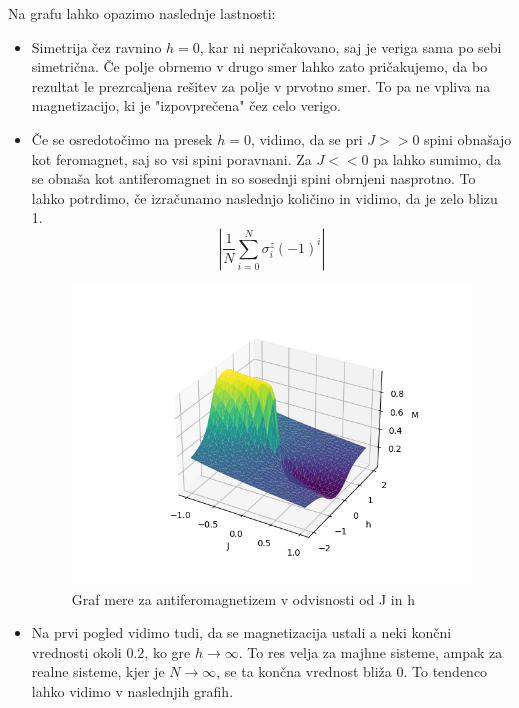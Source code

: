 \documentclass{article}
\begin{document}
\noindent Na grafu lahko opazimo naslednje lastnosti:
\begin{itemize}
    \item Simetrija čez ravnino $h = 0$, kar ni nepričakovano, saj je veriga sama po sebi simetrična. Če polje obrnemo v drugo smer lahko zato pričakujemo, da bo rezultat le prezrcaljena rešitev za polje v prvotno smer. To pa ne vpliva na magnetizacijo, ki je "izpovprečena" čez celo verigo.  

    \item Če se osredotočimo na presek $h = 0$, vidimo, da se pri $J >> 0$ spini obnašajo kot feromagnet, saj so vsi spini poravnani. Za $J << 0$ pa lahko sumimo, da se obnaša kot antiferomagnet in so sosednji spini obrnjeni nasprotno. To lahko potrdimo, če izračunamo naslednjo količino in vidimo, da je zelo blizu 1.
    \begin{equation}
    |\frac{1}{N}\sum_{i=0}^N \sigma_i^z (-1)^i|
    \end{equation}
    \begin{figure}[H]
        \centering
         \includegraphics[]{STFIM_antiferomag.png}
        \caption{Graf mere za antiferomagnetizem v odvisnosti od J in h}
        \label{fig:enter-label}
    \end{figure}
   

    \item Na prvi pogled vidimo tudi, da se magnetizacija ustali a neki končni vrednosti okoli $0.2$, ko gre $h \rightarrow \infty$. To res velja za majhne sisteme, ampak za realne sisteme, kjer je $N \rightarrow \infty$, se ta končna vrednost bliža 0. To tendenco lahko vidimo v naslednjih grafih.


\end{itemize}
\end{document}
